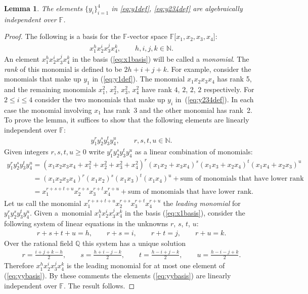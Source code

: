 \documentclass[11pt]{article}
\numberwithin{equation}{section}
\newtheorem{Lemma}[Theorem]{Lemma}
\begin{document}
\begin{Lemma}
\label{lem:fiveindep}
The elements
 $\lbrace y_i\rbrace_{i=1}^4$ in
\eqref{eq:y1def},
\eqref{eq:y234def}
 are algebraically
independent over $\mathbb F$.
\end{Lemma}
\begin{proof}
The following is a basis for
the $\mathbb F$-vector space
$\mathbb F\lbrack x_1, x_2, x_3, x_4\rbrack$:
\begin{gather}
x_1^hx_2^ix_3^jx_4^k, \qquad h,i,j,k\in \mathbb N.
\label{eq:x1basis}
\end{gather}
An element
$x_1^hx_2^ix_3^jx_4^k$
in
the basis
(\ref{eq:x1basis}) will be called a {\it monomial}.
The {\it rank} of this monomial is def\/ined
to be $2h+i+j+k$.
For example,
consider the monomials that make up
$y_1$ in
(\ref{eq:y1def}).
The monomial
$x_1x_2x_3x_4$ has rank 5, and
the remaining monomials
$x_1^2$, $x_2^2$, $x_3^2$, $x_4^2$ have rank
$4$, $2$, $2$, $2$ respectively.
For $2 \leq i \leq 4$
consider the two monomials that make up $y_i$ in~(\ref{eq:y234def}). In each case
the monomial involving $x_1$ has
rank~3 and the other monomial
has rank~2.
To prove the lemma,
it suf\/f\/ices to show that the following elements
are linearly independent over $\mathbb F$:
\begin{gather}
y_1^ry_2^sy_3^ty_4^u, \qquad r,s,t,u\in \mathbb N.
\label{eq:yybasis}
\end{gather}
Given integers $r,s,t,u\geq 0$
 write
$y_1^ry_2^sy_3^ty_4^u$
as a linear combination of monomials:
\begin{gather*}
y_1^ry_2^sy_3^ty_4^u
=
(x_1x_2x_3x_4
+x_1^2+x_2^2+x_3^2+x_4^2)^r
(x_1x_2+x_3x_4)^s
(x_1x_3+x_2x_4)^t
(x_1x_4+x_2x_3)^u
\\
\phantom{y_1^ry_2^sy_3^ty_4^u}{} =
(x_1x_2x_3x_4)^r
(x_1x_2)^s
(x_1x_3)^t
(x_1x_4)^u
 + {\mbox{sum of monomials that have lower rank}}
\\
\phantom{y_1^ry_2^sy_3^ty_4^u}{} =
x_1^{r+s+t+u}
x_2^{r+s}
x_3^{r+t}
x_4^{r+u}
  +  {\mbox{sum of monomials that have lower rank}}.
\end{gather*}
Let us call
the monomial
$x_1^{r+s+t+u}
x_2^{r+s}
x_3^{r+t}
x_4^{r+u} $ the {\it leading monomial} for
$y_1^ry_2^sy_3^ty_4^u$. Given a~monomial $x_1^hx_2^ix_3^jx_4^k$ in the basis
(\ref{eq:x1basis}), consider the following
system of
linear equations in the unknowns $r$, $s$, $t$, $u$:
\begin{gather*}
r+s+t+u=h,
\qquad r+s=i,
\qquad r+t=j,
\qquad r+u=k.
\end{gather*}
Over the rational f\/ield $\mathbb Q$ this system has a unique
solution
\begin{gather*}
 r = \frac{i+j+k-h}{2},
\qquad
s = \frac{h+i-j-k}{2},
\qquad
 t = \frac{h-i+j-k}{2},
  \qquad
u = \frac{h-i-j+k}{2}.
\end{gather*}
Therefore
 $x_1^hx_2^ix_3^jx_4^k$
is the leading monomial
for at most one element
of (\ref{eq:yybasis}).
By these comments the elements
(\ref{eq:yybasis}) are linearly independent over $\mathbb F$.
The result follows.
\end{proof}
\end{document}
